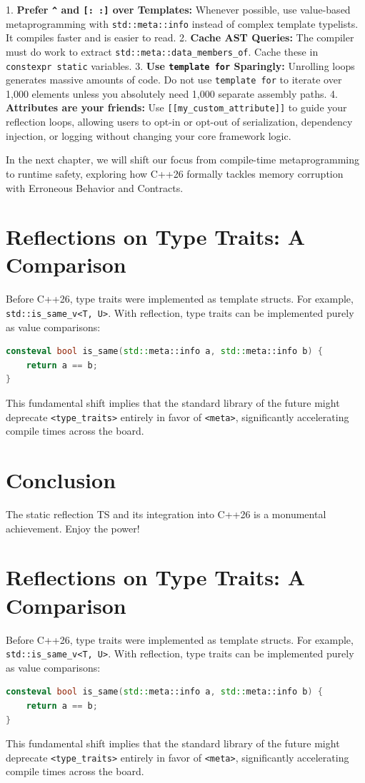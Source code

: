 1. \textbf{Prefer \texttt{^} and \texttt{[: :]} over Templates:} Whenever possible, use value-based metaprogramming with \texttt{std::meta::info} instead of complex template typelists. It compiles faster and is easier to read.
2. \textbf{Cache AST Queries:} The compiler must do work to extract \texttt{std::meta::data_members_of}. Cache these in \texttt{constexpr static} variables.
3. \textbf{Use \texttt{template for} Sparingly:} Unrolling loops generates massive amounts of code. Do not use \texttt{template for} to iterate over 1,000 elements unless you absolutely need 1,000 separate assembly paths.
4. \textbf{Attributes are your friends:} Use \texttt{[[my_custom_attribute]]} to guide your reflection loops, allowing users to opt-in or opt-out of serialization, dependency injection, or logging without changing your core framework logic.

In the next chapter, we will shift our focus from compile-time metaprogramming to runtime safety, exploring how C++26 formally tackles memory corruption with Erroneous Behavior and Contracts.

\section{Reflections on Type Traits: A Comparison}

Before C++26, type traits were implemented as template structs. For example, \texttt{std::is_same_v<T, U>}.
With reflection, type traits can be implemented purely as value comparisons:
\begin{lstlisting}[language=C++]
consteval bool is_same(std::meta::info a, std::meta::info b) {
    return a == b;
}
\end{lstlisting}
This fundamental shift implies that the standard library of the future might deprecate \texttt{<type_traits>} entirely in favor of \texttt{<meta>}, significantly accelerating compile times across the board.

\section{Conclusion}
The static reflection TS and its integration into C++26 is a monumental achievement. Enjoy the power!

\section{Reflections on Type Traits: A Comparison}

Before C++26, type traits were implemented as template structs. For example, \texttt{std::is_same_v<T, U>}.
With reflection, type traits can be implemented purely as value comparisons:
\begin{lstlisting}[language=C++]
consteval bool is_same(std::meta::info a, std::meta::info b) {
    return a == b;
}
\end{lstlisting}
This fundamental shift implies that the standard library of the future might deprecate \texttt{<type_traits>} entirely in favor of \texttt{<meta>}, significantly accelerating compile times across the board.

